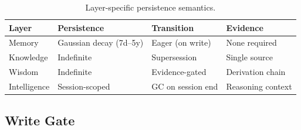 \documentclass[11pt,a4paper]{article}
\begin{document}
\begin{table}[H]
\centering
\caption{Layer-specific persistence semantics.}
\label{tab:persistence}
\begin{tabular}{@{}llll@{}}
\toprule
\textbf{Layer} & \textbf{Persistence} & \textbf{Transition} & \textbf{Evidence} \\
\midrule
Memory & Gaussian decay (7d--5y) & Eager (on write) & None required \\
Knowledge & Indefinite & Supersession & Single source \\
Wisdom & Indefinite & Evidence-gated & Derivation chain \\
Intelligence & Session-scoped & GC on session end & Reasoning context \\
\bottomrule
\end{tabular}
\end{table}

\subsection{Write Gate}
\end{document}
